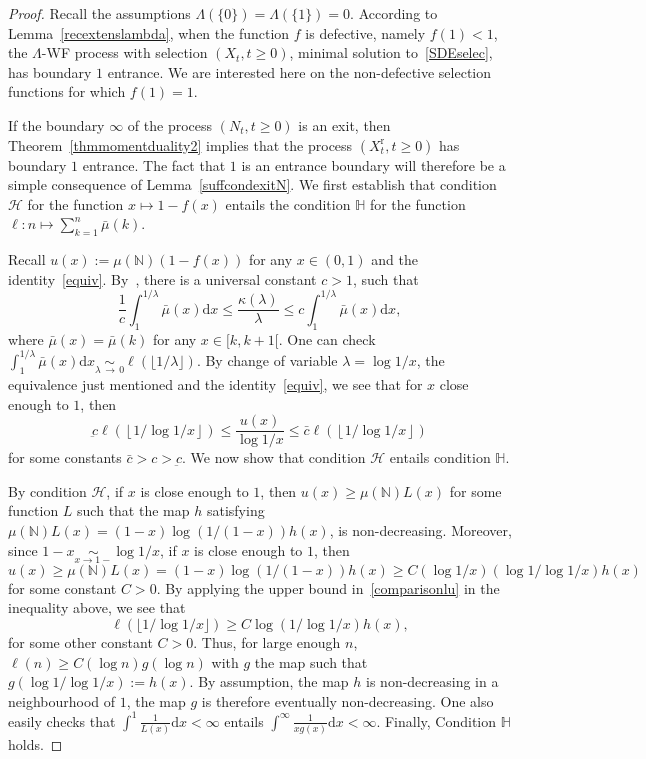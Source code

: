 \documentclass[AHL,Unicode,longabstracts,published]{cedram}
\newcommand{\ddr}{\mathrm{d}}
\newcommand{\rmr}{\mathrm{r}}
\newcommand{\bbN}{\mathbb{N}}
\newcommand{\bbH}{\mathbb{H}}
\newcommand{\clH}{\mathcal{H}}
\begin{document}
\begin{proof}
Recall the assumptions $\Lambda(\{0\})=\Lambda(\{1\})=0$. According to Lemma~\ref{recextenslambda}, when the function $f$ is defective, namely $f(1)<1$, the $\Lambda$-WF process with selection $(X_t,t\geq 0)$, minimal solution to~\eqref{SDEselec}, has boundary $1$ entrance. We are interested here on the non-defective selection functions for which $f(1)=1$.


If the boundary $\infty$ of the process $(N_t,t\geq 0)$ is an exit, then Theorem~\ref{thmmomentduality2} implies that the process $(X_t^{\rmr},t\geq 0)$ has boundary $1$ entrance. The fact that $1$ is an entrance boundary will therefore be a simple consequence of Lemma~\ref{suffcondexitN}. We first establish that condition $\clH$ for the function $x\mapsto 1-f(x)$ entails the condition $\bbH$ for the function $\ell :n\mapsto \sum_{k=1}^{n}\bar{\mu}(k)$.

Recall $u(x):=\mu(\bbN)(1-f(x))$ for any $x\in (0,1)$ and the identity~\eqref{equiv}. By~\cite[Proposition~1, Chapter~III]{Bertoin96}, there is a universal constant $c>1$, such that
\[
\frac{1}{c}\int_{1}^{1/\lambda}\bar{\mu}(x)\ddr x \leq \frac{\kappa(\lambda)}{\lambda}\leq c \int_{1}^{1/\lambda}\bar{\mu}(x)\ddr x,
\]
where $\bar{\mu}(x)=\bar{\mu}(k)$ for any $x\in [k,k+1[$. One can check $\int_{1}^{1/\lambda}\bar{\mu}(x)\ddr x \underset{\lambda\,\rightarrow\,0}{\sim} \ell(\lfloor 1/\lambda \rfloor).$ By change of variable $\lambda=\log 1/x$, the equivalence just mentioned and the identity~\eqref{equiv}, we see that for $x$ close enough to $1$, then
\begin{equation}\label{comparisonlu}
\underbar c \ell\left(\left \lfloor 1/\log 1/x \right \rfloor \right)\leq \frac{u(x)}{\log 1/x}\leq \bar c \ell\left(\left \lfloor 1/\log 1/x \right \rfloor \right)
\end{equation}
for some constants $\bar c>c>\underbar c $. We now show that condition $\clH$ entails condition $\bbH$.

By condition $\clH$, if $x$ is close enough to $1$, then $u(x)\geq \mu(\bbN)L(x)$ for some function $L$ such that the map $h$ satisfying $\mu(\bbN)L(x)=(1-x)\log\left(1/(1-x)\right) h(x)$, is non-decreasing. Moreover, since $1-x \underset{x\rightarrow 1-}{\sim} \log 1/x$, if $x$ is close enough to $1$, then
\[
u(x)\geq \mu(\bbN)L(x)=(1-x)\log\left(1/(1-x)\right) h(x) \geq C(\log 1/x) (\log 1/\log 1/x) h(x)
\]
for some constant $C>0$. By applying the upper bound in~\eqref{comparisonlu} in the inequality above, we see that
\[
\ell\left(\lfloor 1/\log 1/x \rfloor \right)\geq C\log(1/\log 1/x) h(x),
\]
for some other constant $C>0$. Thus, for large enough $n$,
$\ell(n)\geq C(\log n)g(\log n)$ with $g$ the map such that $g(\log 1/\log 1/x):=h(x)$. By assumption, the map $h$ is non-decreasing in a neighbourhood of $1$, the map $g$ is therefore eventually non-decreasing. One also easily checks that $\int^{1}\frac{1}{L(x)}\ddr x<\infty$ entails $\int^{\infty}\frac{1}{xg(x)}\ddr x<\infty$. Finally, Condition $\bbH$ holds.


\end{proof}
\end{document}

